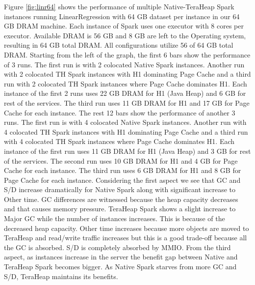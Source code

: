 Figure \ref{fig:linr64} shows the performance of multiple
Native-TeraHeap Spark instances running LinearRegression with 64 GB
dataset per instance in our 64 GB DRAM machine. Each instance of Spark
uses one executor with 8 cores per executor. Available DRAM is 56 GB
and 8 GB are left to the Operating system, resulting in 64 GB total
DRAM. All configurations utilize 56 of 64 GB total DRAM. 
Starting from the left of the graph, the first 6 bars show the
performance of 3 runs. The first run is with 2 colocated Native Spark instances.
Another run with 2 colocated TH Spark instances with H1 dominating Page Cache
and a third run with 2 colocated TH Spark instances where Page Cache dominates H1. 
Each instance of the first 2 runs uses 22 GB DRAM for H1 (Java Heap) and 6 GB for rest of the services.
The third run uses 11 GB DRAM for H1 and 17 GB for Page Cache for each instance. 
The rest 12 bars show the performance of another 3 runs. The first run is with 4 colocated Native Spark instances.
Another run with 4 colocated TH Spark instances with H1 dominating Page Cache
and a third run with 4 colocated TH Spark instances where Page Cache dominates H1. 
Each instance of the first run uses 11 GB DRAM for H1 (Java Heap) and 3 GB for rest of the services. 
The second run uses 10 GB DRAM for H1 and 4 GB for Page Cache for each instance. 
The third run uses 6 GB DRAM for H1 and 8 GB for Page Cache for each instance. 
Considering the first aspect we see that GC and S/D increase dramatically for Native Spark along with significant increase to Other time. GC differences are witnessed because the heap capacity decreases and that causes memory pressure. TeraHeap Spark shows a slight increase to Major GC while the number of instances increases. This is because of the decreased heap capacity. Other time increases because more objects are moved to TeraHeap and read/write traffic increases but this is a good trade-off because all the GC is absorbed. S/D is completely absorbed by MMIO. From the third aspect, as instances increase in the server the benefit gap between Native and TeraHeap Spark becomes bigger. As Native Spark starves from more GC and S/D, TeraHeap maintains its benefits. 

